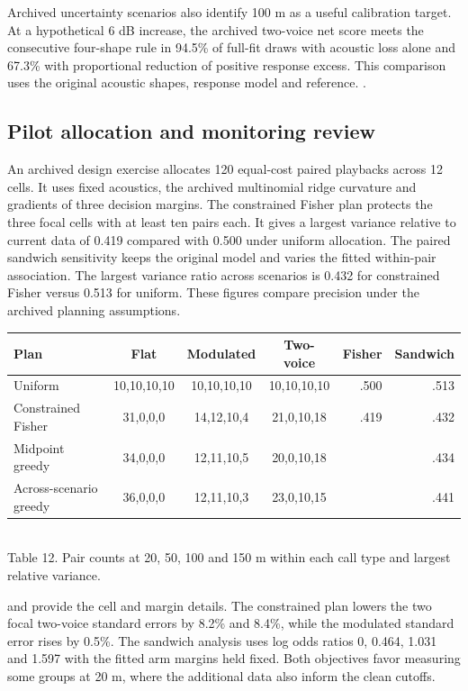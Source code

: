 {Archived uncertainty scenarios also identify 100 m as a useful calibration target. At a hypothetical 6 dB increase, the archived two-voice net score meets the consecutive four-shape rule in 94.5\% of full-fit draws with acoustic loss alone and 67.3\% with proportional reduction of positive response excess. This comparison uses the original acoustic shapes, response model and reference. .

\clearpage
\subsection{Pilot allocation and monitoring review}
An archived design exercise allocates 120 equal-cost paired playbacks across 12 cells. It uses fixed acoustics, the archived multinomial ridge curvature and gradients of three decision margins. The constrained Fisher plan protects the three focal cells with at least ten pairs each. It gives a largest variance relative to current data of 0.419 compared with 0.500 under uniform allocation. The paired sandwich sensitivity keeps the original model and varies the fitted within-pair association. The largest variance ratio across scenarios is 0.432 for constrained Fisher versus 0.513 for uniform. These figures compare precision under the archived planning assumptions.

\begin{center}\small
\begin{tabular}{lcccrr}
\toprule
Plan & Flat & Modulated & Two-voice & Fisher & Sandwich\\
\midrule
Uniform & 10,10,10,10 & 10,10,10,10 & 10,10,10,10 & .500 & .513\\
Constrained Fisher & 31,0,0,0 & 14,12,10,4 & 21,0,10,18 & .419 & .432\\
Midpoint greedy & 34,0,0,0 & 12,11,10,5 & 20,0,10,18 & & .434\\
Across-scenario greedy & 36,0,0,0 & 12,11,10,3 & 23,0,10,15 & & .441\\
\bottomrule
\end{tabular}\\[3pt]
Table 12. Pair counts at 20, 50, 100 and 150 m within each call type and largest relative variance.
\end{center}
 and  provide the cell and margin details. The constrained plan lowers the two focal two-voice standard errors by 8.2\% and 8.4\%, while the modulated standard error rises by 0.5\%. The sandwich analysis uses log odds ratios 0, 0.464, 1.031 and 1.597 with the fitted arm margins held fixed. Both objectives favor measuring some groups at 20 m, where the additional data also inform the clean cutoffs.

}
